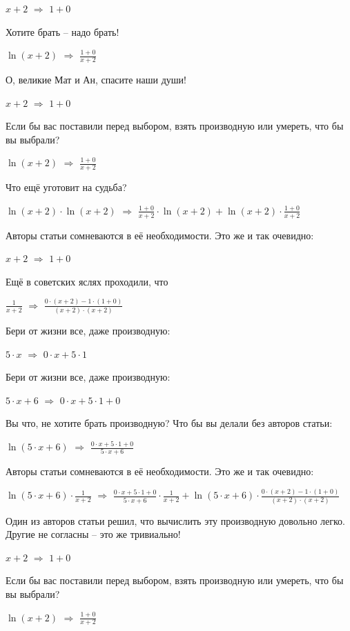 \documentclass{article}
\begin{document}
$x + 2$ $\Rightarrow$ $1 + 0$

Хотите брать -- надо брать!

$ \ln (x + 2)$ $\Rightarrow$ $\frac{1 + 0}{x + 2}$

О, великие Мат и Ан, спасите наши души!

$x + 2$ $\Rightarrow$ $1 + 0$

Если бы вас поставили перед выбором, взять производную или умереть, что бы вы выбрали?

$ \ln (x + 2)$ $\Rightarrow$ $\frac{1 + 0}{x + 2}$

Что ещё уготовит на судьба?

$ \ln (x + 2) \cdot  \ln (x + 2)$ $\Rightarrow$ $\frac{1 + 0}{x + 2} \cdot  \ln (x + 2) +  \ln (x + 2) \cdot \frac{1 + 0}{x + 2}$

Авторы статьи сомневаются в её необходимости. Это же и так очевидно:

$x + 2$ $\Rightarrow$ $1 + 0$

Ещё в советских яслях проходили, что

$\frac{1}{x + 2}$ $\Rightarrow$ $\frac{0 \cdot (x + 2) - 1 \cdot (1 + 0)}{(x + 2) \cdot (x + 2)}$

Бери от жизни все, даже производную:

$5 \cdot x$ $\Rightarrow$ $0 \cdot x + 5 \cdot 1$

Бери от жизни все, даже производную:

$5 \cdot x + 6$ $\Rightarrow$ $0 \cdot x + 5 \cdot 1 + 0$

Вы что, не хотите брать производную? Что бы вы делали без авторов статьи:

$ \ln (5 \cdot x + 6)$ $\Rightarrow$ $\frac{0 \cdot x + 5 \cdot 1 + 0}{5 \cdot x + 6}$

Авторы статьи сомневаются в её необходимости. Это же и так очевидно:

$ \ln (5 \cdot x + 6) \cdot \frac{1}{x + 2}$ $\Rightarrow$ $\frac{0 \cdot x + 5 \cdot 1 + 0}{5 \cdot x + 6} \cdot \frac{1}{x + 2} +  \ln (5 \cdot x + 6) \cdot \frac{0 \cdot (x + 2) - 1 \cdot (1 + 0)}{(x + 2) \cdot (x + 2)}$

Один из авторов статьи решил, что вычислить эту производную довольно легко. Другие не согласны -- это же тривиально!

$x + 2$ $\Rightarrow$ $1 + 0$

Если бы вас поставили перед выбором, взять производную или умереть, что бы вы выбрали?

$ \ln (x + 2)$ $\Rightarrow$ $\frac{1 + 0}{x + 2}$
\end{document}
